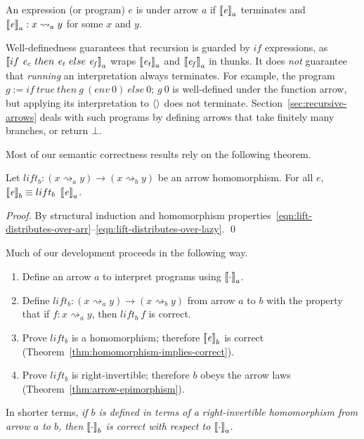 \documentclass{llncs}
\newcommand{\arrow}{\rightsquigarrow}
\newcommand{\gen}{_a}
\newcommand{\genb}{_b}
\begin{document}
\begin{definition}
\label{def:well-defined-expression}
An expression (or program) $\mathit{e}$ is  under arrow $a$ if $\meaningof{\mathit{e}}\gen$ terminates and $\meaningof{\mathit{e}}\gen : x \arrow\gen y$ for some $x$ and $y$.
\end{definition}

Well-definedness guarantees that recursion is guarded by $if$ expressions, as $\meaningof{if~\mathit{e_c}~then~\mathit{e_t}~else~\mathit{e_f}}\gen$ wraps $\meaningof{\mathit{e_t}}\gen$ and $\meaningof{\mathit{e_f}}\gen$ in thunks.
It does \emph{not} guarantee that \emph{running} an interpretation always terminates.
For example, the program
$g := if~true~then~g~(env~0)~else~0;\,g~0$
is well-defined under the function arrow, but applying its interpretation to $\langle{}\rangle$ does not terminate.
Section~\ref{sec:recursive-arrows} deals with such programs by defining arrows that take finitely many branches, or return $\bot$.

Most of our semantic correctness results rely on the following theorem.

\begin{theorem}
\label{thm:homomorphism-implies-correct}
Let $lift\genb : (x \arrow\gen y) \to (x \arrow\genb y)$ be an arrow homomorphism.
For all $\mathit{e}$, $\meaningof{\mathit{e}}\genb \equiv lift\genb~\meaningof{\mathit{e}}\gen$.%
\end{theorem}
\begin{proof}
By structural induction and homomorphism properties~\eqref{eqn:lift-distributes-over-arr}--\eqref{eqn:lift-distributes-over-lazy}.
\qed
\end{proof}

Much of our development proceeds in the following way.
\begin{enumerate}
	\item Define an arrow $a$ to interpret programs using $\left\llbracket{\cdot}\right\rrbracket_a$.
	\item Define $lift\genb : (x \arrow\gen y) \to (x \arrow\genb y)$ from arrow $a$ to $b$ with the property that if $f : x \arrow\gen y$, then $lift\genb~f$ is correct.
	\item Prove $lift_b$ is a homomorphism; therefore $\meaningof{\mathit{e}}\genb$ is correct (Theorem~\ref{thm:homomorphism-implies-correct}).
	\item Prove $lift_b$ is right-invertible; therefore $b$ obeys the arrow laws (Theorem~\ref{thm:arrow-epimorphism}).
\end{enumerate}
In shorter terms, \emph{if $b$ is defined in terms of a right-invertible homomorphism from arrow $a$ to $b$, then $\left\llbracket{\cdot}\right\rrbracket_b$ is correct with respect to $\left\llbracket{\cdot}\right\rrbracket_a$}.
\end{document}

